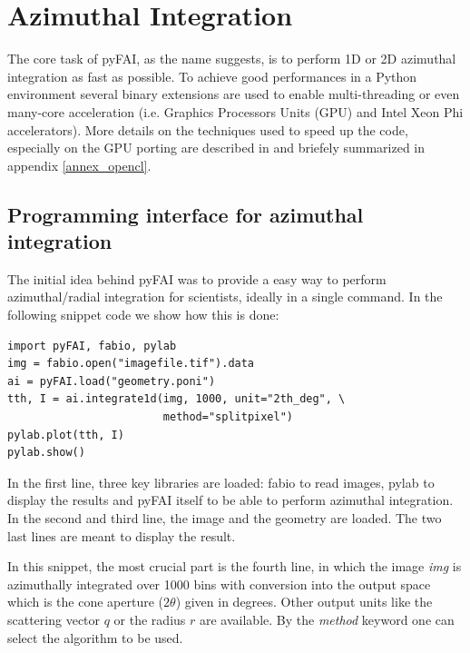 \documentclass{iucr}
\begin{document}
\section{Azimuthal Integration}

The core task of pyFAI, as the name suggests, is to perform 1D or 2D azimuthal
integration as fast as possible. To achieve good performances in a Python environment
several binary extensions are used to enable multi-threading or even many-core
acceleration (i.e. Graphics Processors Units (GPU) and Intel Xeon Phi
accelerators).
More details on the techniques used to speed up the code, especially on the GPU porting
are described in \cite{kieffer_ashiotis-proc-euroscipy-2014} and briefely
summarized in appendix \ref{annex_opencl}.

\subsection{Programming interface for azimuthal integration}

The initial idea behind pyFAI was to provide a easy way to perform
azimuthal/radial integration for scientists, ideally in a single command.
In the following snippet code we show how this is done:

\begin{verbatim}
import pyFAI, fabio, pylab
img = fabio.open("imagefile.tif").data
ai = pyFAI.load("geometry.poni")
tth, I = ai.integrate1d(img, 1000, unit="2th_deg", \
                        method="splitpixel")
pylab.plot(tth, I)
pylab.show()
\end{verbatim}

In the first line, three key libraries are loaded: fabio \cite{fabio} to read
images, pylab \cite{matplotlib} to display the results and pyFAI itself to be
able to perform azimuthal integration.
In the second and third line,  the image and the geometry are loaded.
The two last lines are meant to display the result.

In this snippet, the most crucial part is the fourth line, in which the image
\textit{img} is azimuthally integrated over 1000 bins with conversion  into
the output space which is the cone aperture ($2\theta$) given in degrees.
Other output units like the scattering vector $q$ or the radius $r$ are
available. By the \textit{method} keyword one can select the
algorithm to be used.
\end{document}
